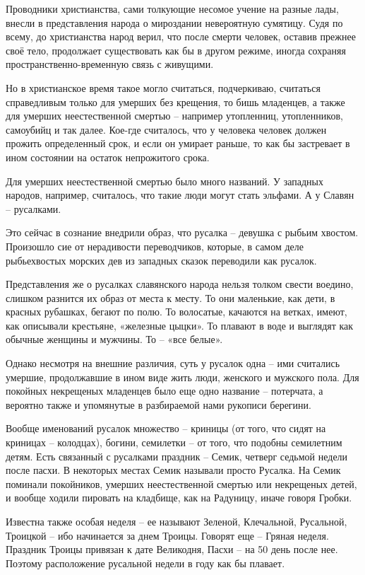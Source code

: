 \documentclass[a5paper,11pt,openany]{article}
\begin{document}
    Проводники христианства, сами толкующие несомое учение на разные лады, внесли в представления народа о мироздании невероятную сумятицу. Судя по всему, до христианства народ верил, что после смерти человек, оставив прежнее своё тело, продолжает существовать как бы в другом режиме, иногда сохраняя пространственно-временную связь с живущими.

    Но в христианское время такое могло считаться, подчеркиваю, считаться справедливым только для умерших без крещения, то бишь младенцев, а также для умерших неестественной смертью – например утопленниц, утопленников, самоубийц и так далее. Кое-где считалось, что у человека человек должен прожить определенный срок, и если он умирает раньше, то как бы застревает в ином состоянии на остаток непрожитого срока.

   Для умерших неестественной смертью было много названий. У западных народов, например, считалось, что такие люди могут стать эльфами. А у Славян – русалками.

Это сейчас в сознание внедрили образ, что русалка – девушка с рыбьим хвостом. Произошло сие от нерадивости переводчиков, которые, в самом деле рыбьехвостых морских дев из западных сказок переводили как русалок.

Представления же о русалках славянского народа нельзя толком свести воедино, слишком разнится их образ от места к месту. То они маленькие, как дети, в красных рубашках, бегают по полю. То волосатые, качаются на ветках, имеют, как описывали крестьяне, «железные цыцки». То плавают в воде и выглядят как обычные женщины и мужчины. То – «все белые».

   Однако несмотря на внешние различия, суть у русалок одна – ими считались умершие, продолжавшие в ином виде жить люди, женского и мужского пола. Для покойных некрещеных младенцев было еще одно название – потерчата, а вероятно также и упомянутые в разбираемой нами рукописи берегини.

   Вообще именований русалок множество – криницы (от того, что сидят на криницах – колодцах), богини, семилетки – от того, что подобны семилетним детям. Есть связанный с русалками праздник – Семик, четверг седьмой недели после пасхи. В некоторых местах Семик называли просто Русалка. На Семик поминали покойников, умерших неестественной смертью или некрещеных детей, и вообще ходили пировать на кладбище, как на Радуницу, иначе говоря Гробки.

   Известна также особая неделя – ее называют Зеленой, Клечальной, Русальной, Троицкой – ибо начинается за днем Троицы. Говорят еще – Гряная неделя. Праздник Троицы привязан к дате Великодня, Пасхи – на 50 день после нее. Поэтому расположение русальной недели в году как бы плавает. 
\end{document}
